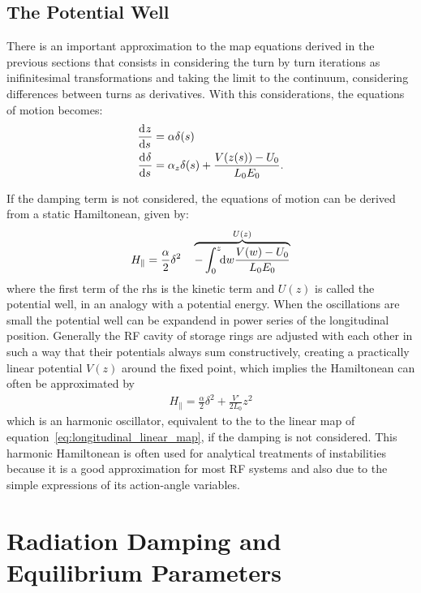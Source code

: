 \subsection{The Potential Well}

	There is an important approximation to the map equations derived in the previous sections that consists in considering the turn by turn iterations as inifinitesimal transformations and taking the limit to the continuum, considering differences between turns as derivatives. With this considerations, the equations of motion becomes:
	\begin{align}
		\dertot{z}{s} &= \alpha \delta(s) \\\nonumber
		\dertot{\delta}{s} &= \alpha_z\delta(s) + \frac{V(z(s))-U_0}{L_0E_0}.
	\end{align}

    If the damping term is not considered, the equations of motion can be derived from a static Hamiltonean, given by:
	\begin{align}\label{eq:longitudinal_hamiltonean}
		H_\parallel = \frac\alpha2\delta^2 \quad \overbrace{-
                            \defint{w}{\frac{V(w)-U_0}{L_0E_0}}{0}{z}
                        }^{U(z)}
	\end{align}
	where the first term of the \gls{rhs} is the kinetic term and $U(z)$ is called the potential well, in an analogy with a potential energy. When the oscillations are small the potential well can be expandend in power series of the longitudinal position. Generally the RF cavity of storage rings are adjusted with each other in such a way that their potentials always sum constructively, creating a practically linear potential $V(z)$ around the fixed point, which implies the Hamiltonean can often be approximated by
    \begin{align}
        H_\parallel = \frac\alpha2\delta^2 + \frac{V'}{2L_0}z^2
    \end{align}
    which is an harmonic oscillator, equivalent to the to the linear map of equation~\eqref{eq:longitudinal_linear_map}, if the damping is not considered. This harmonic Hamiltonean is often used for analytical treatments of instabilities because it is a good approximation for most RF systems and also due to the simple expressions of its action-angle variables.

\section{Radiation Damping and Equilibrium Parameters}


